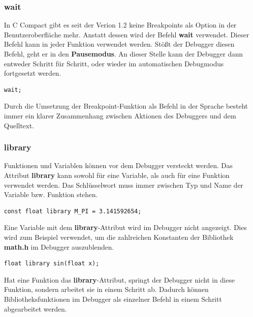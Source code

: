 \subsubsection*{wait}
In C Compact gibt es seit der Verion 1.2 keine Breakpoints als Option in der Benutzeroberfläche mehr. Anstatt dessen wird der Befehl \textbf{wait} verwendet. Dieser Befehl kann in jeder Funktion verwendet werden. Stößt der Debugger diesen Befehl, geht er in den \textbf{Pausemodus}. An dieser Stelle kann der Debugger dann entweder Schritt für Schritt, oder wieder im automatischen Debugmodus fortgesetzt werden.

\begin{lstlisting}[language=CMM]
wait;
\end{lstlisting}

Durch die Umsetzung der Breakpoint-Funktion als Befehl in der Sprache besteht immer ein klarer Zusammenhang zwischen Aktionen des Debuggers und dem Quelltext.

\subsubsection*{library}
Funktionen und Variablen können vor dem Debugger \glqq{}versteckt\grqq{} werden. Das Attribut \textbf{library} kann sowohl für eine Variable, als auch für eine Funktion verwendet werden. Das Schlüsselwort muss immer zwischen Typ und Name der Variable bzw. Funktion stehen.

\begin{lstlisting}[language=CMM]
const float library M_PI = 3.141592654;
\end{lstlisting}
Eine Variable mit dem \textbf{library}-Attribut wird im Debugger nicht angezeigt. Dies wird zum Beispiel verwendet, um die zahlreichen Konstanten der Bibliothek \textbf{math.h} im Debugger auszublenden.

\begin{lstlisting}[language=CMM]
float library sin(float x);
\end{lstlisting}
Hat eine Funktion das \textbf{library}-Attribut, springt der Debugger nicht in diese Funktion, sondern arbeitet sie in einem Schritt ab. Dadurch können Bibliotheksfunktionen im Debugger als einzelner Befehl in einem Schritt abgearbeitet werden.
